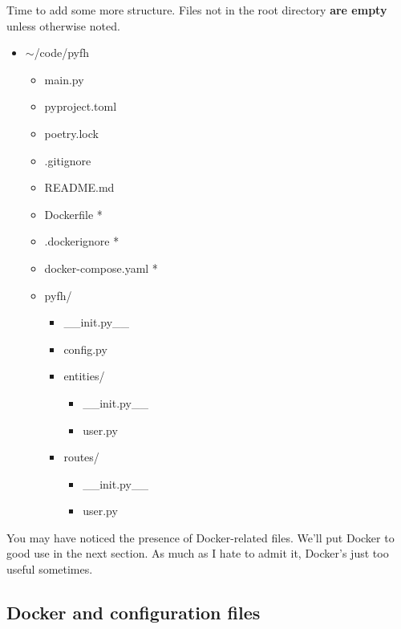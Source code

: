 \documentclass[14pt]{extarticle}
\begin{document}
Time to add some more structure. Files not in the root directory \textbf{are empty} unless otherwise noted.

{\ttfamily
\begin{itemize}
    \item{$\sim$/code/pyfh}
        \begin{itemize}
            \item{main.py}
            \item{pyproject.toml}
            \item{poetry.lock}
            \item{.gitignore}
            \item{README.md}
            \item{Dockerfile *}
            \item{.dockerignore *}
            \item{docker-compose.yaml *}
            \item{pyfh/}
                \begin{itemize}
                    \item{\_\_init.py\_\_}
                    \item{config.py}
                    \item{entities/}
                        \begin{itemize}
                            \item{\_\_init.py\_\_}
                            \item{user.py}
                        \end{itemize}
                    \item{routes/}
                        \begin{itemize}
                            \item{\_\_init.py\_\_}
                            \item{user.py}
                        \end{itemize}
                \end{itemize}
        \end{itemize}
\end{itemize}
}

You may have noticed the presence of Docker-related files. We'll put Docker to good use in the next section. As much as I hate to admit it, Docker's just too useful sometimes.

\subsection{Docker and configuration files}
\end{document}
